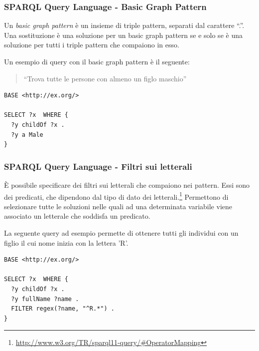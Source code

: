 \documentclass[8pt]{beamer}
\begin{document}
\begin{frame}[fragile]
 \frametitle{SPARQL Query Language - Basic Graph Pattern}
Un \emph{basic graph pattern} \`e un insieme di triple pattern, separati
dal carattere ``.''. Una sostituzione \`e una soluzione per un basic graph
pattern se e solo se \`e una soluzione per tutti i triple pattern
che compaiono in esso.
\vspace{\baselineskip}

Un esempio di query con il basic graph pattern \`e il seguente:
\begin{quote}
``Trova tutte le persone con almeno un figlo maschio''
\end{quote}
\begin{Verbatim}[fontsize=\small]
BASE <http://ex.org/>

SELECT ?x  WHERE { 
  ?y childOf ?x .
  ?y a Male
}
\end{Verbatim}
\vspace{\baselineskip}

\end{frame}

\begin{frame}[fragile]
 \frametitle{SPARQL Query Language - Filtri sui letterali}
\`E possibile specificare dei filtri sui letterali che compaiono nei pattern.
Essi sono dei predicati, che dipendono dal tipo di dato dei letterali.\footnote{\url{http://www.w3.org/TR/sparql11-query/\#OperatorMapping}}
Permettono di selezionare tutte le soluzioni nelle quali ad una 
determinata variabile viene associato un letterale che soddisfa un predicato.
\vspace{\baselineskip}

La seguente query ad esempio permette di ottenere tutti
gli individui con un figlio il cui nome inizia con la lettera 'R'.
\begin{Verbatim}[fontsize=\small]
BASE <http://ex.org/>

SELECT ?x  WHERE { 
  ?y childOf ?x .
  ?y fullName ?name .
  FILTER regex(?name, "^R.*") .
}
\end{Verbatim}
\end{frame}
\end{document}
